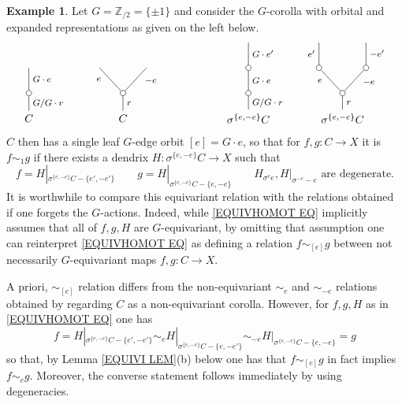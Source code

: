 \documentclass[a4paper,10pt
,draft
]{article}%
\numberwithin{equation}{section}
\numberwithin{figure}{section}
\theoremstyle{definition} %
\newtheorem{example}[equation]{Example}%
\newcommand{\1}{\ensuremath{\mathbbm 1}}%
\begin{document}
\begin{example}\label{EQUIVSIM EX}
	Let $G = \mathbb{Z}_{/2} = \{\pm 1\}$
	and consider the $G$-corolla with orbital and expanded representations as given on the left below.
\[
\begin{tikzpicture}
[grow=up,auto,level distance=2.3em,every node/.style = {font=\footnotesize},dummy/.style={circle,draw,inner sep=0pt,minimum size=1.75mm}]
	\node at (0,0) [font=\normalsize]{$C$}
		child{node [dummy] {}
			child{
			edge from parent node [swap] {$G \cdot e$}
node [name=Kone,swap] {}}
		edge from parent node [swap] {$G/G \cdot r$}
		};
	\node at (3,0) [font=\normalsize]{$C$}
		child{node [dummy] {}
			child{
			edge from parent node [swap,near end] {$-e$} node [name=Kn] {}}
			child{
			edge from parent node [near end] {$e$}
node [name=Kone,swap] {}}
		edge from parent node [swap] {$r$}
		};
	\node at (7,0) [font=\normalsize]{$\sigma^{\{e,-e\}} C$}
		child{node [dummy] {}
			child{node [dummy] {}
				child{
				edge from parent node [swap] {$G \cdot e'$}
node [swap] {}}
			edge from parent node [swap] {$G \cdot e$}
node [swap] {}}
		edge from parent node [swap] {$G/G \cdot r$}
		};
	\node at (10,0) [font=\normalsize]{$\sigma^{\{e,-e\}} C$}
		child{node [dummy] {}
			child{node [dummy] {}
				child{
				edge from parent node [swap] {$-e'$} node {}}
			edge from parent node [swap,near end] {$-e$} node {}}
			child{node [dummy] {}
				child{
				edge from parent node {$e'$}
node [swap] {}}
			edge from parent node [near end] {$e$}
node [swap] {}}
		edge from parent node [swap] {$r$}
		};
\end{tikzpicture}
\]
$C$ then has a single leaf $G$-edge orbit $[e] = G \cdot e$, so that for
$f,g \colon C \to X$ it is
$f \sim_1 g$
if there exists a dendrix
$H \colon \sigma^{\{e,-e\}}C \to X$
such that 
\begin{equation}\label{EQUIVHOMOT EQ}
	f = H|_{\sigma^{\{e,-e\}}C - \{e',-e'\}}
\qquad
	g = H|_{\sigma^{\{e,-e\}}C - \{e,-e\}}
\qquad
	H_{\sigma^e e}, H|_{\sigma^{-e}-e} \text{ are degenerate}.
\end{equation}
It is worthwhile to compare this equivariant relation with the relations obtained if one forgets the $G$-actions. Indeed, while \eqref{EQUIVHOMOT EQ} implicitly assumes that all of $f,g,H$ are $G$-equivariant,
by omitting that assumption one can reinterpret 
\eqref{EQUIVHOMOT EQ}
as defining a relation
$f \sim_{[e]} g$ between not necessarily $G$-equivariant maps $f,g \colon C \to X$.

A priori, $\sim_{[e]}$ relation differs from the 
non-equivariant 
$\sim_{e}$ and $\sim_{-e}$
relations obtained by regarding $C$ as a non-equivariant corolla.
However, for $f,g,H$ as in \eqref{EQUIVHOMOT EQ} one has
\begin{equation}\label{EQUIVSIM EQ}
f = H|_{\sigma^{\{e,-e\}}C - \{e',-e'\}}
\sim_e H|_{\sigma^{\{e,-e\}}C - \{e,-e'\}}
\sim_{-e} H|_{\sigma^{\{e,-e\}}C - \{e,-e\}} =g
\end{equation}
so that, by Lemma \ref{EQUIVI LEM}(b) below one has that
$f \sim_{[e]} g$ in fact implies
$f \sim_{e} g$. Moreover, the converse statement follows immediately by using degeneracies.


\end{example}
\end{document}

